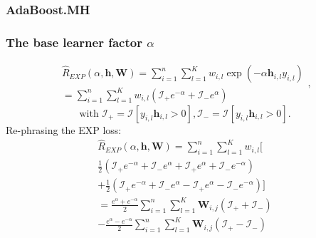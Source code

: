 \documentclass{beamer}
\begin{document}
\begin{frame}
\frametitle{AdaBoost.MH}
\begin{algorithm}[H]
\end{algorithm}
\end{frame}

\begin{frame}
\frametitle{The base learner factor $\alpha$}
$$\begin{array}{c}
\hat{R}_{EXP}(\alpha, \mathbf{h}, \mathbf{W}) = \sum_{i=1}^{n} \sum_{l=1}^{K} w_{i,l} \exp(-\alpha \mathbf{h}_{i,l} y_{i,l}) \\
 = \sum_{i=1}^{n} \sum_{l=1}^{K} w_{i,l}(\mathcal{I}_+ e^{-\alpha} + \mathcal{I}_- e^{\alpha})
 \end{array},$$
$$\text{with } \mathcal{I}_+ = \mathcal{I}[y_{i,l} \mathbf{h}_{i,l} > 0], \mathcal{I}_- = \mathcal{I}[y_{i,l} \mathbf{h}_{i,l} > 0]. $$
\pause
Re-phrasing the EXP loss:
$$\begin{array}{c}
\hat{R}_{EXP}(\alpha, \mathbf{h}, \mathbf{W}) = \sum_{i=1}^{n} \sum_{l=1}^{K} w_{i,l}[ \\
  \frac{1}{2}(\mathcal{I}_+ e^{-\alpha} +\mathcal{I}_- e^{\alpha} + \mathcal{I}_+ e^{\alpha} + \mathcal{I}_- e^{-\alpha}) \\
  + \frac{1}{2}(\mathcal{I}_+ e^{-\alpha} + \mathcal{I}_- e^{\alpha} - \mathcal{I}_+ e^{\alpha} - \mathcal{I}_- e^{-\alpha})] \\
= \frac{e^\alpha + e^{-\alpha}}{2}\sum_{i=1}^{n} \sum_{l=1}^{K}\mathbf{W}_{i,j}(\mathcal{I}_+ + \mathcal{I}_-) \\
  - \frac{e^\alpha - e^{-\alpha}}{2}\sum_{i=1}^{n}\sum_{l=1}^{K}\mathbf{W}_{i,j}(\mathcal{I}_+ - \mathcal{I}_-) 
 \end{array} $$
\end{frame}
\end{document}
